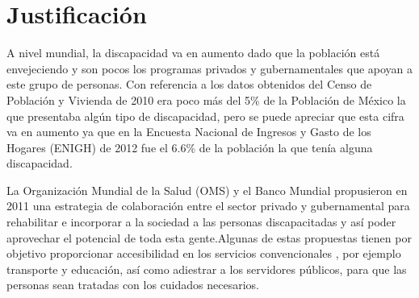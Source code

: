 
\section{Justificaci\'on}
A nivel mundial, la discapacidad va en aumento dado que la poblaci\'on est\'a
 envejeciendo y son pocos los programas privados y gubernamentales que apoyan a
 este grupo de personas\cite{OrganizacionMundialdelaSalud2011}. 
 Con referencia a los datos obtenidos del Censo de Poblaci\'on
 y Vivienda de 2010 era poco m\'as del 5\% de la Poblaci\'on de M\'exico la que
 presentaba alg\'un tipo de discapacidad, pero se puede apreciar que esta cifra
 va en aumento ya que en la Encuesta Nacional de Ingresos y Gasto de los 
 Hogares (ENIGH) de 2012 fue el 6.6\% de la poblaci\'on la que ten\'ia alguna
 discapacidad\cite{Milosavljevic2014}.
 


 
La Organizaci\'on Mundial de la Salud (OMS) y el Banco Mundial
 propusieron en 2011 \cite{OrganizacionMundialdelaSalud2011} una
 estrategia de colaboraci\'on entre el sector privado y gubernamental para
 rehabilitar e incorporar a la sociedad a las personas discapacitadas y as\'i
 poder aprovechar el potencial de toda esta gente.Algunas de estas propuestas
 tienen por objetivo proporcionar accesibilidad en los servicios convencionales
 , por ejemplo transporte y educaci\'on, as\'i como adiestrar a los servidores
 p\'ublicos, para que las personas sean tratadas con los cuidados necesarios.
 
